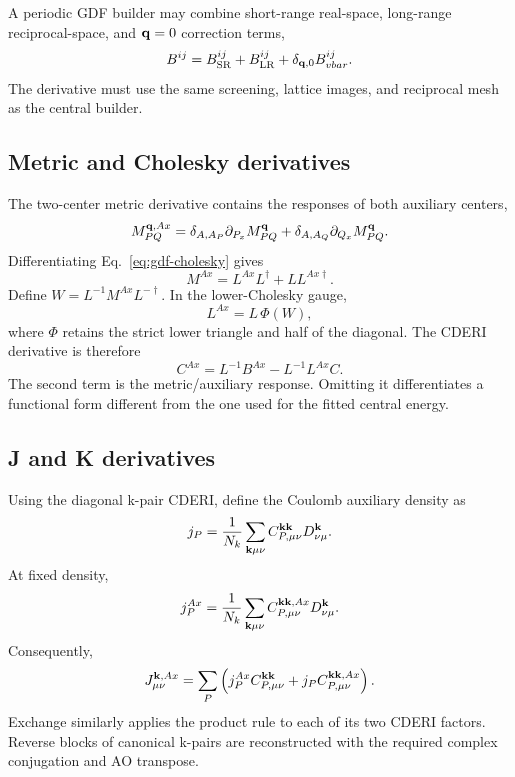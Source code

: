 A periodic GDF builder may combine short-range real-space, long-range
reciprocal-space, and $\mathbf{q}=0$ correction terms,
\begin{equation}
  B^{ij}=B_{\mathrm{SR}}^{ij}+B_{\mathrm{LR}}^{ij}
  +\delta_{\mathbf{q},0}B_{vbar}^{ij}.
  \label{eq:gdf-source-parts}
\end{equation}
The derivative must use the same screening, lattice images, and reciprocal
mesh as the central builder.

\subsection{Metric and Cholesky derivatives}

The two-center metric derivative contains the responses of both auxiliary
centers,
\begin{equation}
  M_{PQ}^{\mathbf{q},Ax}
  =\delta_{A,A_P}\partial_{P_x}M_{PQ}^{\mathbf{q}}
   +\delta_{A,A_Q}\partial_{Q_x}M_{PQ}^{\mathbf{q}}.
  \label{eq:gdf-metric-centers}
\end{equation}
Differentiating Eq.~\eqref{eq:gdf-cholesky} gives
\begin{equation}
  M^{Ax}=L^{Ax}L^\dagger+LL^{Ax\dagger}.
  \label{eq:gdf-cholesky-derivative}
\end{equation}
Define $W=L^{-1}M^{Ax}L^{-\dagger}$.  In the lower-Cholesky gauge,
\begin{equation}
  L^{Ax}=L\,\Phi(W),
  \label{eq:gdf-cholesky-gauge}
\end{equation}
where $\Phi$ retains the strict lower triangle and half of the diagonal.  The
CDERI derivative is therefore
\begin{equation}
  C^{Ax}
  =L^{-1}B^{Ax}-L^{-1}L^{Ax}C.
  \label{eq:gdf-cderi-derivative}
\end{equation}
The second term is the metric/auxiliary response.  Omitting it differentiates a
functional form different from the one used for the fitted central energy.

\subsection{J and K derivatives}

Using the diagonal k-pair CDERI, define the Coulomb auxiliary density as
\begin{equation}
  j_P=\frac{1}{N_k}\sum_{\mathbf{k}\mu\nu}
      C_{P,\mu\nu}^{\mathbf{k}\mathbf{k}}D_{\nu\mu}^{\mathbf{k}}.
  \label{eq:gdf-coulomb-aux-density}
\end{equation}
At fixed density,
\begin{equation}
  j_P^{Ax}=\frac{1}{N_k}\sum_{\mathbf{k}\mu\nu}
      C_{P,\mu\nu}^{\mathbf{k}\mathbf{k},Ax}D_{\nu\mu}^{\mathbf{k}}.
  \label{eq:gdf-coulomb-aux-derivative}
\end{equation}
Consequently,
\begin{equation}
  J_{\mu\nu}^{\mathbf{k},Ax}
  =\sum_P\left(j_P^{Ax}C_{P,\mu\nu}^{\mathbf{k}\mathbf{k}}
              +j_PC_{P,\mu\nu}^{\mathbf{k}\mathbf{k},Ax}\right).
  \label{eq:gdf-j-derivative}
\end{equation}
Exchange similarly applies the product rule to each of its two CDERI factors.
Reverse blocks of canonical k-pairs are reconstructed with the required
complex conjugation and AO transpose.

